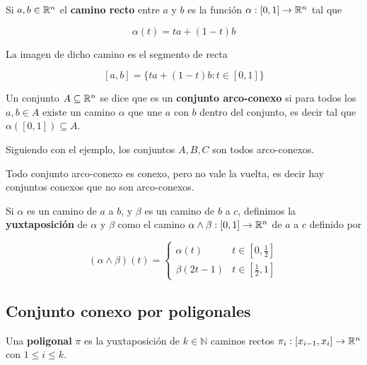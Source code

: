 \begin{example}
Si $a, b \in \mathbb{R}^n$ el \textbf{camino recto} entre $a$ y $b$ es la función $\alpha : [0,1] \to \mathbb{R}^n$ tal que

$$ \alpha(t) = ta + (1-t)b $$

La imagen de dicho camino es el segmento de recta

$$ [a,b] = \{ ta + (1-t)b : t \in [0,1] \} $$
\end{example}

\begin{definition}
Un conjunto $A \subseteq \mathbb{R}^n$ se dice que es un \textbf{conjunto arco-conexo}  si para todos los $a,b \in A$ existe un camino $\alpha$ que une $a$ con $b$ dentro del conjunto, es decir tal que $\alpha([0,1]) \subseteq A$.
\end{definition}

\begin{example}
Siguiendo con el ejemplo, los conjuntos $A,B,C$ son todos arco-conexos.
\end{example}

\begin{observation}
Todo conjunto arco-conexo es conexo, pero no vale la vuelta, es decir hay conjuntos conexos que no son arco-conexos.
\end{observation}

\begin{definition}
Si $\alpha$ es un camino de $a$ a $b$, y $\beta$ es un camino de $b$ a $c$, definimos la \textbf{yuxtaposición} de $\alpha$ y $\beta$ como el camino $ \alpha \wedge \beta : [0,1] \to \mathbb{R}^n$ de $a$ a $c$ definido por 

\[
(\alpha \wedge \beta)(t) = 
\begin{cases}
\alpha(t) &  t \in [0, \frac{1}{2}] \\
\beta(2t-1) &  t \in [\frac{1}{2},1]
\end{cases}
\]
\end{definition}

\subsection{Conjunto conexo por poligonales}

\begin{definition}[Poligonal]
Una \textbf{poligonal} $\pi$ es la yuxtaposición de $k \in \mathbb{N}$ caminos rectos $\pi_i : [x_{i-1}, x_i] \to \mathbb{R}^n$ con $1 \leq i \leq k$. 
\end{definition}

